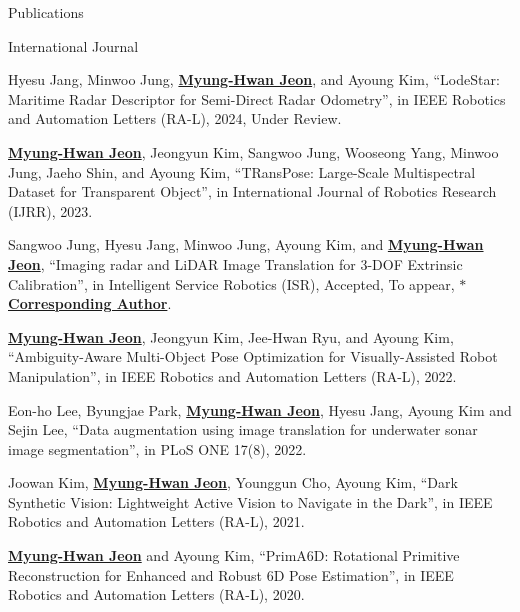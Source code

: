 \begin{rSection}{Publications}



\begin{pubSubsection}{International Journal}

  \item Hyesu Jang, Minwoo Jung, \underline{\textbf{Myung-Hwan Jeon}}, and Ayoung Kim, “LodeStar: Maritime Radar Descriptor for Semi-Direct Radar Odometry”, in IEEE Robotics and Automation Letters (RA-L), 2024, Under Review.

  \item \underline{\textbf{Myung-Hwan Jeon}}, Jeongyun Kim, Sangwoo Jung, Wooseong Yang, Minwoo Jung, Jaeho Shin, and Ayoung Kim, “TRansPose: Large-Scale Multispectral Dataset for Transparent Object”, in International Journal of Robotics Research (IJRR), 2023.

  \item Sangwoo Jung, Hyesu Jang, Minwoo Jung, Ayoung Kim, and \underline{\textbf{Myung-Hwan Jeon}}, “Imaging radar and LiDAR Image Translation for 3-DOF Extrinsic Calibration”, in Intelligent Service Robotics (ISR), Accepted, To appear, \underline{\textbf{$\ast$Corresponding Author}}.

  \item \underline{\textbf{Myung-Hwan Jeon}}, Jeongyun Kim, Jee-Hwan Ryu, and Ayoung Kim, “Ambiguity-Aware Multi-Object Pose Optimization for Visually-Assisted Robot Manipulation”, in IEEE Robotics and Automation Letters (RA-L), 2022.
  
  \item Eon-ho Lee, Byungjae Park, \underline{\textbf{Myung-Hwan Jeon}}, Hyesu Jang, Ayoung Kim and Sejin Lee, “Data augmentation using image translation for underwater sonar image segmentation”, in PLoS ONE 17(8), 2022.
  
  \item Joowan Kim, \underline{\textbf{Myung-Hwan Jeon}}, Younggun Cho, Ayoung Kim, “Dark Synthetic Vision: Lightweight Active Vision to Navigate in the Dark”, in IEEE Robotics and Automation Letters (RA-L), 2021.
  
  \item \underline{\textbf{Myung-Hwan Jeon}} and Ayoung Kim, “PrimA6D: Rotational Primitive Reconstruction for Enhanced and Robust 6D Pose Estimation”, in IEEE Robotics and Automation Letters (RA-L), 2020.  


\end{pubSubsection}
\end{rSection}
